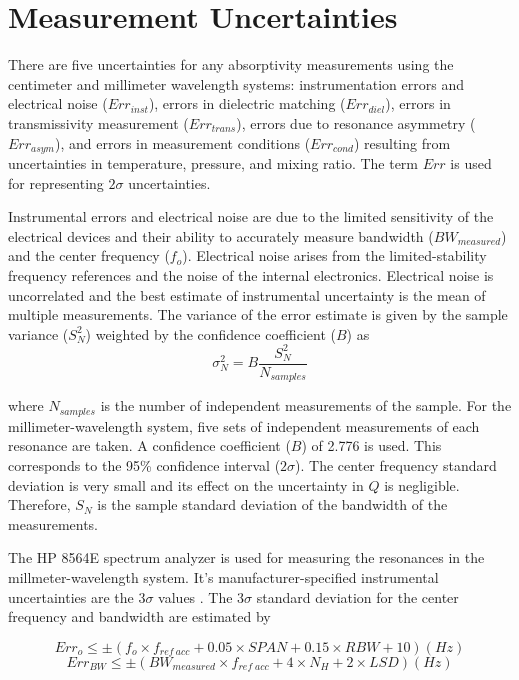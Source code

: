 \section{Measurement Uncertainties}

There are five uncertainties for any absorptivity measurements using the centimeter and millimeter wavelength systems: instrumentation errors and electrical noise ($Err_{inst}$), errors in dielectric matching ($Err_{diel}$), errors in transmissivity measurement ($Err_{trans}$), errors due to resonance asymmetry ($Err_{asym}$), and errors in measurement conditions ($Err_{cond}$) resulting from uncertainties in temperature, pressure, and mixing ratio. The term $Err$ is used for representing $2\sigma$ uncertainties.

Instrumental errors and electrical noise are due to the limited sensitivity of the electrical devices and their ability to accurately measure bandwidth ($BW_{measured}$) and the center frequency ($f_o$). Electrical noise arises from the limited-stability frequency references and the noise of the internal electronics. Electrical noise is uncorrelated and the best estimate of instrumental uncertainty is the mean of multiple measurements. The variance of the error estimate is given by the sample variance ($S^2_N$) weighted by the confidence coefficient ($B$) as
\begin{equation}\label{eq:sigman}
\sigma^2_N = B \frac{S^2_N}{N_{samples}}
\end{equation}

\noindent where $N_{samples}$ is the number of independent measurements of the sample. For the millimeter-wavelength system, five sets of independent measurements of each resonance are taken. A confidence coefficient ($B$) of 2.776 is used. This corresponds to the 95\% confidence interval ($2\sigma$). The center frequency standard deviation is very small and its effect on the uncertainty in $Q$ is negligible. Therefore, $S_N$ is the sample standard deviation of the bandwidth of the measurements.

The HP 8564E spectrum analyzer is used for measuring the resonances in the millmeter-wavelength system. It's manufacturer-specified instrumental uncertainties are the $3\sigma$ values \cite{Hewlett-Packard}. The $3\sigma$ standard deviation for the center frequency and bandwidth are estimated by 

\begin{equation}\label{eq:sigmao}
Err_o \leq \pm (f_o \times f_{ref\:acc} + 0.05 \times SPAN + 0.15 \times RBW +10 ) (Hz)
\end{equation}
\begin{equation}\label{eq:sigmabw}
Err_{BW} \leq \pm (BW_{measured} \times f_{ref\;acc} + 4 \times N_H +2 \times LSD ) (Hz)
\end{equation}

